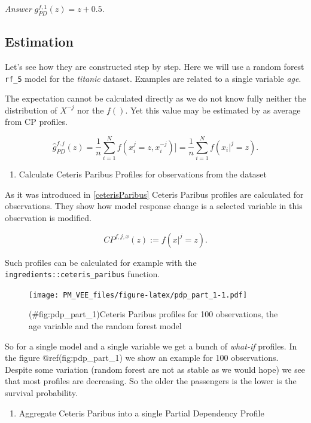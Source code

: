 \documentclass[12pt,]{krantz}
\providecommand{\tightlist}{%
  \setlength{\itemsep}{0pt}\setlength{\parskip}{0pt}}
\begin{document}
\emph{Answer} \(g_{PD}^{f, 1}(z) = z + 0.5\).

\hypertarget{estimation}{%
\subsection{Estimation}\label{estimation}}

Let's see how they are constructed step by step.
Here we will use a random forest \texttt{rf\_5} model for the \emph{titanic} dataset. Examples are related to a single variable \emph{age}.

The expectation cannot be calculated directly as we do not know fully neither the distribution of \(X^{-j}\) nor the \(f()\). Yet this value may be estimated by as average from CP profiles.

\[
\hat g_{PD}^{f, j}(z) = \frac 1n \sum_{i=1}^{N} f(x_i^j=z, x^{-j}_i)] = \frac 1n \sum_{i=1}^{N} f(x_i|^j=z).
\]

\begin{enumerate}
\def\labelenumi{\arabic{enumi}.}
\tightlist
\item
  Calculate Ceteris Paribus Profiles for observations from the dataset
\end{enumerate}

As it was introduced in \ref{ceterisParibus} Ceteris Paribus profiles are calculated for observations. They show how model response change is a selected variable in this observation is modified.

\[
CP^{f, j, x}(z) := f(x|^j = z).
\]

Such profiles can be calculated for example with the \texttt{ingredients::ceteris\_paribus} function.

\begin{figure}
\centering
\texttt{[image: PM\_VEE\_files/figure-latex/pdp\_part\_1-1.pdf]}
\caption{(\#fig:pdp\_part\_1)Ceteris Paribus profiles for 100 observations, the age variable and the random forest model}
\end{figure}

So for a single model and a single variable we get a bunch of \emph{what-if} profiles. In the figure @ref(fig:pdp\_part\_1) we show an example for 100 observations. Despite some variation (random forest are not as stable as we would hope) we see that most profiles are decreasing. So the older the passengers is the lower is the survival probability.

\begin{enumerate}
\def\labelenumi{\arabic{enumi}.}
\setcounter{enumi}{1}
\tightlist
\item
  Aggregate Ceteris Paribus into a single Partial Dependency Profile
\end{enumerate}
\end{document}
